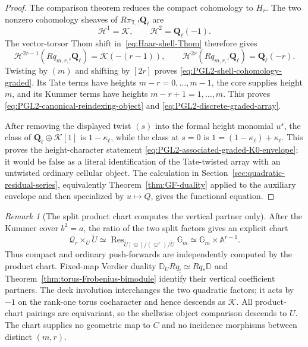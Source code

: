 \documentclass[11pt]{article}
\theoremstyle{definition}
\theoremstyle{remark}
\newtheorem{remark}[theorem]{Remark}
\newcommand{\Qell}{\mathbf Q_\ell}
\newcommand{\kappaell}{\kappa_{\ell}}
\newcommand{\cK}{\mathcal K}
\newcommand{\D}{\mathbb D}
\begin{document}
\begin{proof}
The comparison theorem reduces the compact cohomology to $H_r$.  The two
nonzero cohomology sheaves of $R\pi_{\mathbb T,!}\Qell$ are
\[
 \mathcal H^1=\cK,
 \qquad \mathcal H^2=\Qell(-1).
\]
The vector-torsor Thom shift in~\eqref{eq:Haar-shell-Thom} therefore gives
\[
 \mathcal H^{2r-1}(Rq_{m,r,!}\Qell)=\cK(-(r-1)),
 \qquad
 \mathcal H^{2r}(Rq_{m,r,!}\Qell)=\Qell(-r).
\]
Twisting by $(m)$ and shifting by $[2r]$ proves
\eqref{eq:PGL2-shell-cohomology-graded}.  Its Tate terms have heights
$m-r=0,\ldots,m-1$, the core supplies height $m$, and its Kummer terms have
heights $m-r+1=1,\ldots,m$.  This proves
\eqref{eq:PGL2-canonical-reindexing-object} and
\eqref{eq:PGL2-discrete-graded-array}.

After removing the displayed twist $(s)$ into the formal height monomial
$u^s$, the class of $\Qell\oplus\cK[1]$ is $1-\kappaell$, while the class at
$s=0$ is $1=(1-\kappaell)+\kappaell$.  This proves the height-character statement
\eqref{eq:PGL2-associated-graded-K0-envelope}; it would be false as a literal
identification of the Tate-twisted array with an untwisted ordinary cellular
object.  The calculation in
Section~\ref{sec:quadratic-residual-series}, equivalently
Theorem~\ref{thm:GF-duality} applied to the auxiliary envelope and then
specialized by $u\mapsto Q$, gives the functional equation.
\end{proof}

\begin{remark}[The split product chart computes the vertical partner only]
After the Kummer cover $b^2=a$, the ratio of the two split factors gives an
explicit chart
\begin{equation}
 \mathscr Q_r\times_U\widetilde U
 \simeq
 \operatorname{Res}_{\widetilde U[\varpi]/(\varpi^r)/\widetilde U}
 \mathbb G_m
 \simeq\mathbb G_m\times\mathbb A^{r-1}.
 \label{eq:PGL2-split-tame-product-chart}
\end{equation}
Thus compact and ordinary push-forwards are independently computed by the
product chart.  Fixed-map Verdier duality
$\D_U Rq_!\simeq Rq_*\D$ and
Theorem~\ref{thm:torus-Frobenius-bimodule} identify their vertical coefficient
partners.  The deck involution interchanges the two
quadratic factors; it acts by $-1$ on the rank-one torus cocharacter and hence
descends as $\cK$.  All product-chart pairings are equivariant, so the
shellwise object comparison descends to $U$.  The chart supplies no geometric
map to $C$ and no incidence morphisms between distinct $(m,r)$.
\end{remark}
\end{document}
